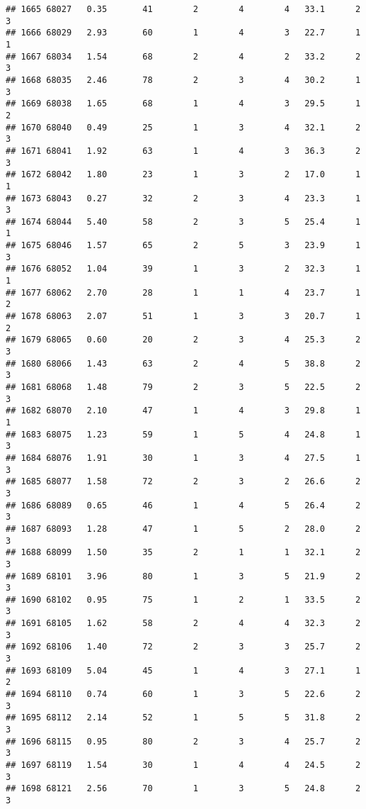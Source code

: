 \documentclass[
]{article}
\begin{document}
\begin{verbatim}
## 1665 68027   0.35       41        2        4        4   33.1      2      3
## 1666 68029   2.93       60        1        4        3   22.7      1      1
## 1667 68034   1.54       68        2        4        2   33.2      2      3
## 1668 68035   2.46       78        2        3        4   30.2      1      3
## 1669 68038   1.65       68        1        4        3   29.5      1      2
## 1670 68040   0.49       25        1        3        4   32.1      2      3
## 1671 68041   1.92       63        1        4        3   36.3      2      3
## 1672 68042   1.80       23        1        3        2   17.0      1      1
## 1673 68043   0.27       32        2        3        4   23.3      1      3
## 1674 68044   5.40       58        2        3        5   25.4      1      1
## 1675 68046   1.57       65        2        5        3   23.9      1      3
## 1676 68052   1.04       39        1        3        2   32.3      1      1
## 1677 68062   2.70       28        1        1        4   23.7      1      2
## 1678 68063   2.07       51        1        3        3   20.7      1      2
## 1679 68065   0.60       20        2        3        4   25.3      2      3
## 1680 68066   1.43       63        2        4        5   38.8      2      3
## 1681 68068   1.48       79        2        3        5   22.5      2      3
## 1682 68070   2.10       47        1        4        3   29.8      1      1
## 1683 68075   1.23       59        1        5        4   24.8      1      3
## 1684 68076   1.91       30        1        3        4   27.5      1      3
## 1685 68077   1.58       72        2        3        2   26.6      2      3
## 1686 68089   0.65       46        1        4        5   26.4      2      3
## 1687 68093   1.28       47        1        5        2   28.0      2      3
## 1688 68099   1.50       35        2        1        1   32.1      2      3
## 1689 68101   3.96       80        1        3        5   21.9      2      3
## 1690 68102   0.95       75        1        2        1   33.5      2      3
## 1691 68105   1.62       58        2        4        4   32.3      2      3
## 1692 68106   1.40       72        2        3        3   25.7      2      3
## 1693 68109   5.04       45        1        4        3   27.1      1      2
## 1694 68110   0.74       60        1        3        5   22.6      2      3
## 1695 68112   2.14       52        1        5        5   31.8      2      3
## 1696 68115   0.95       80        2        3        4   25.7      2      3
## 1697 68119   1.54       30        1        4        4   24.5      2      3
## 1698 68121   2.56       70        1        3        5   24.8      2      3

\end{verbatim}
\end{document}
